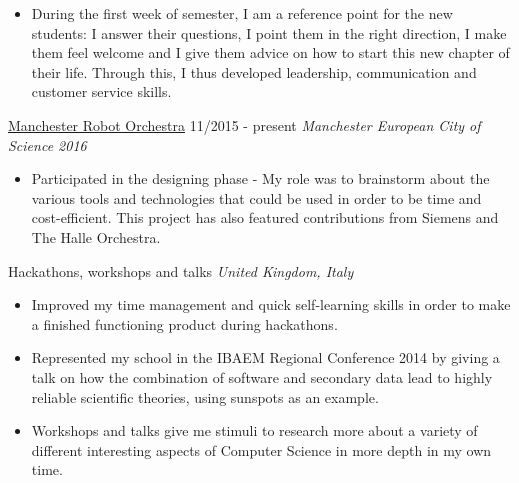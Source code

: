 \documentclass[]{friggeri-cv}
\begin{document}
\begin{entrylist}
    \begin{itemize}
        \item During the first week of semester, I am a reference point for the new students: I answer their questions, I point them in the right direction, I make them feel welcome and I give them advice on how to start this new chapter of their life. Through this, I thus developed leadership, communication and customer service skills.\\
    \end{itemize}
  \entry
    {}
    {\href{http://manchestersciencecity.com/inspire/article/the-robots-are-coming/}{Manchester Robot Orchestra}}
    {11/2015 - present}
    {\emph{Manchester European City of Science 2016}}
    \begin{itemize}
        \item Participated in the designing phase - My role was to brainstorm about the various tools and technologies that could be used in order to be time and cost-efficient. This project has also featured contributions from Siemens and The Halle Orchestra.
    \end{itemize}
  \entry
    {\null}
    {Hackathons, workshops and talks}
    {}
    {\emph{United Kingdom, Italy}}
    \begin{itemize}
        \item Improved my time management and quick self-learning skills in order to make a finished functioning product during hackathons.
        \item Represented my school in the IBAEM Regional Conference 2014 by giving a talk on how the combination of software and secondary data lead to highly reliable scientific theories, using sunspots as an example.
        \item Workshops and talks give me stimuli to research more about a variety of different interesting aspects of Computer Science in more depth in my own time.
    \end{itemize}
\end{entrylist}
\end{document}
